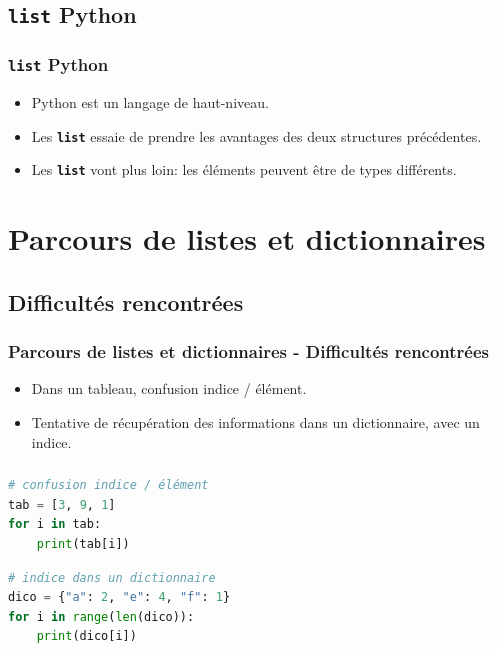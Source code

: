 \documentclass[svgnames,11pt]{beamer}
\begin{document}
\subsection{\textbf{\texttt{list} Python}}
\begin{frame}
    \frametitle{\textbf{\texttt{list} Python}}

    \begin{aretenir}[Observations]
        \begin{itemize}
            \item Python est un langage de haut-niveau.
            \item Les \textbf{\texttt{list}} essaie de prendre les avantages des deux structures précédentes.
            \item Les \textbf{\texttt{list}} vont plus loin: les éléments peuvent être de types différents.
        \end{itemize}
    \end{aretenir}

\end{frame}
\section{Parcours de listes et dictionnaires}
\subsection{Difficultés rencontrées}
\begin{frame}
    \frametitle{Parcours de listes et dictionnaires - Difficultés rencontrées}

    \begin{aretenir}[Constat]
\begin{itemize}
    \item Dans un tableau, confusion indice / élément.
    \item Tentative de récupération des informations dans un dictionnaire, avec un indice.
\end{itemize}
    \end{aretenir}
\end{frame}
\begin{frame}[fragile]
    \frametitle{}

\begin{center}
\begin{lstlisting}[language=Python , basicstyle=\ttfamily\small, xleftmargin=2em, xrightmargin=2em]
# confusion indice / élément
tab = [3, 9, 1]
for i in tab:
    print(tab[i])
\end{lstlisting}
\begin{lstlisting}[language=Python , basicstyle=\ttfamily\small, xleftmargin=2em, xrightmargin=2em]
# indice dans un dictionnaire
dico = {"a": 2, "e": 4, "f": 1}
for i in range(len(dico)):
    print(dico[i])
\end{lstlisting}
\label{CODE}
        \end{center}
\end{frame}
\end{document}
